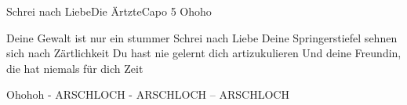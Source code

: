 \begin{song}{Schrei nach Liebe}{Die Ärtzte}{Capo 5}
Ohoho

Deine Gewalt ist nur ein stummer Schrei nach Liebe
Deine Springerstiefel sehnen sich nach Zärtlichkeit
Du hast nie gelernt dich artizukulieren
Und deine Freundin, die hat niemals für dich Zeit

Ohohoh - ARSCHLOCH - ARSCHLOCH – ARSCHLOCH


\end{song}
